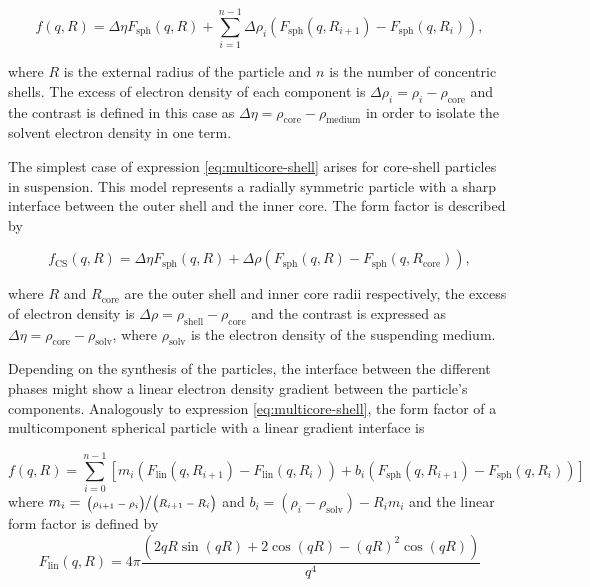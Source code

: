 \begin{equation}
\label{eq:multicore-shell}
f\left(q,R \right)= \Delta \eta F_{\text{sph}}(q,R)+\sum_{i=1}^{n-1} \Delta\rho_i \left( F_{\text{sph}}(q,R_{i+1})-F_{\text{sph}}(q,R_{i}) \right) ,
\end{equation}

where \(R\) is the external radius of the particle and \( n \) is the number of concentric shells. The excess of electron density of each component is $\Delta\rho_i = \rho_i - \rho_{\text{core}}$ and the contrast is defined in this case as $\Delta \eta = \rho_{\text{core}} - \rho_{\text{medium}}$ in order to isolate the solvent electron density in one term.

The simplest case of expression \ref{eq:multicore-shell} arises for core-shell particles in suspension. This model represents a radially symmetric particle with a sharp interface between the outer shell and the inner core. The form factor is described by

\begin{equation}
        \label{eq:ff_cs}
	f_{\text{CS}}(q,R)=  \Delta\eta F_{\text{sph}}(q,R) +  \Delta\rho\left( F_{\text{sph}}(q,R)-F_{\text{sph}}(q,R_{\text{core}}) \right) ,
\end{equation}

where \(R \) and \(R_{\text{core}} \)  are the outer shell and inner core radii respectively, the excess of electron density is \(\Delta\rho=\rho_{\text{shell}}-\rho_{\text{core}}\) and the contrast is expressed as \(\Delta\eta=\rho_{\text{core}}-\rho_{\text{solv}}\), where $\rho_{\text{solv}}$ is the electron density of the suspending medium.

Depending on the synthesis of the particles, the interface between the different phases might show a linear electron density gradient between the particle's components. Analogously to expression \ref{eq:multicore-shell}, the form factor of a multicomponent spherical particle with a linear gradient interface is

\begin{equation}
f\left(q,R \right) = \sum_{i=0}^{n-1}\left[m_i \left( F_{\text{lin}}(q,R_{i+1})-F_{\text{lin}}(q,R_{i}) \right) +b_i \left( F_{\text{sph}}(q,R_{i+1})-F_{\text{sph}}(q,R_{i}) \right) \right]
\end{equation}
where $m_i=\sfrac{\left( \rho_{i+1}-\rho_{i} \right)}{\left( R_{i+1}-R_{i} \right)}$ and $b_i=\left( \rho_i-\rho_{\text{solv}} \right)-R_im_i$ and the linear form factor is defined by
\begin{equation}
F_{\text{lin}}(q,R) = 4\pi\frac{ \left( 2qR\sin(qR)+2\cos(qR)-(qR)^2\cos(qR) \right)}{q^4}
\end{equation}

